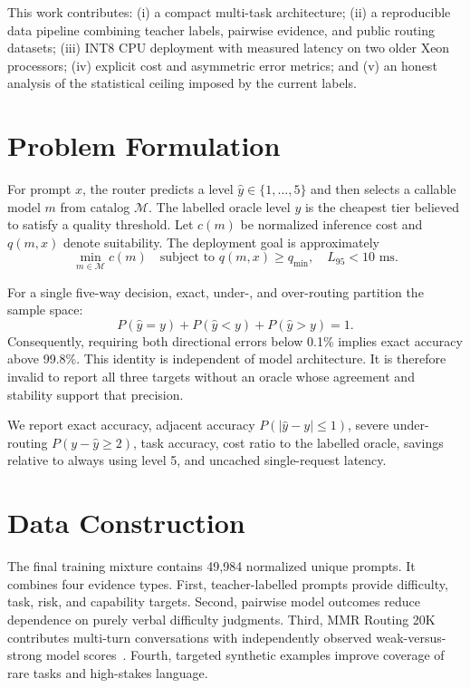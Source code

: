 \documentclass[10pt,twocolumn]{article}
\begin{document}
This work contributes: (i) a compact multi-task architecture; (ii) a reproducible
data pipeline combining teacher labels, pairwise evidence, and public routing
datasets; (iii) INT8 CPU deployment with measured latency on two older Xeon
processors; (iv) explicit cost and asymmetric error metrics; and (v) an honest
analysis of the statistical ceiling imposed by the current labels.

\section{Problem Formulation}
For prompt $x$, the router predicts a level $\hat y\in\{1,\ldots,5\}$ and then
selects a callable model $m$ from catalog $\mathcal M$. The labelled oracle level
$y$ is the cheapest tier believed to satisfy a quality threshold. Let $c(m)$ be
normalized inference cost and $q(m,x)$ denote suitability. The deployment goal is
approximately
\begin{equation}
 \min_{m\in\mathcal M} c(m) \quad
 \text{subject to } q(m,x)\geq q_{\min},\quad L_{95}<10\text{ ms}.
\end{equation}

For a single five-way decision, exact, under-, and over-routing partition the
sample space:
\begin{equation}
 P(\hat y=y)+P(\hat y<y)+P(\hat y>y)=1.
\end{equation}
Consequently, requiring both directional errors below 0.1\% implies exact
accuracy above 99.8\%. This identity is independent of model architecture. It is
therefore invalid to report all three targets without an oracle whose agreement
and stability support that precision.

We report exact accuracy, adjacent accuracy $P(|\hat y-y|\leq1)$, severe
under-routing $P(y-\hat y\geq2)$, task accuracy, cost ratio to the labelled
oracle, savings relative to always using level 5, and uncached single-request
latency.

\section{Data Construction}
The final training mixture contains 49,984 normalized unique prompts. It combines
four evidence types. First, teacher-labelled prompts provide difficulty, task,
risk, and capability targets. Second, pairwise model outcomes reduce dependence
on purely verbal difficulty judgments. Third, MMR Routing 20K contributes
multi-turn conversations with independently observed weak-versus-strong model
scores~\cite{mmr}. Fourth, targeted synthetic examples improve coverage of rare
tasks and high-stakes language.
\end{document}
